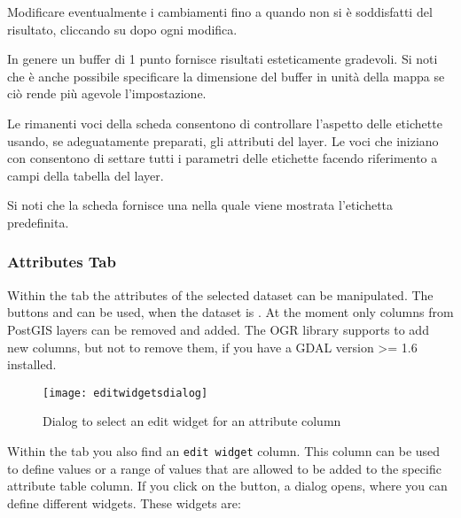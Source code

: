 Modificare eventualmente i cambiamenti fino a quando non si è soddisfatti del
risultato, cliccando su  dopo ogni modifica.

In genere un buffer di 1 punto fornisce risultati esteticamente gradevoli.
Si noti che è anche possibile specificare la dimensione del buffer in unità
della mappa se ciò rende più agevole l'impostazione.

Le rimanenti voci della scheda  consentono di controllare
l'aspetto delle etichette usando, se adeguatamente preparati, gli attributi
del layer. Le voci che iniziano con  consentono di settare
tutti i parametri delle etichette facendo riferimento a campi della tabella
del layer.

Si noti che la scheda  fornisce una 
nella quale viene mostrata l'etichetta predefinita.

\subsubsection{Attributes Tab}\label{label_attributes}

Within the  tab the attributes of the selected dataset can be
manipulated. The buttons  and
 can be
used, when the dataset is .
At the moment only columns from PostGIS layers can be removed and added. The
OGR library supports to add new columns, but not to remove them, if you have
a GDAL version >= 1.6 installed.


\begin{figure}[H]
   \begin{center}
   \caption{Dialog to select an edit widget for an attribute column
\nixcaption}\label{fig:editwidget}\smallskip
   \texttt{[image: editwidgetsdialog]}
\end{center}
\end{figure}

Within the  tab you also find an \texttt{edit widget} column.
This column can be used to define values or a range of values that are
allowed
to be added to the specific attribute table column. If you click on the
 button, a dialog opens, where you can define different
widgets. These widgets are:

